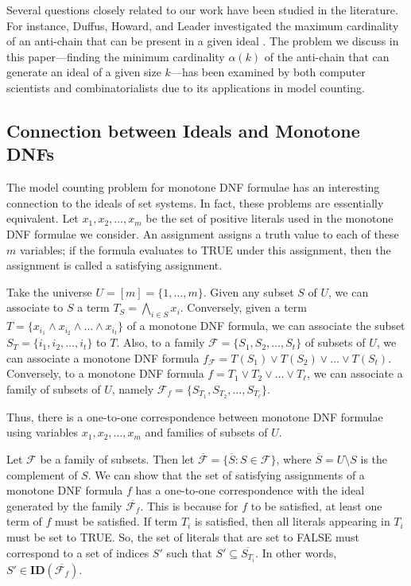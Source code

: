 \documentclass[11pt,a4paper]{article}
\theoremstyle{definition}
\begin{document}
Several questions closely related to our work have been studied 
in the literature. For instance, Duffus, Howard, and Leader 
investigated the maximum cardinality of an anti-chain that can 
be present in a given ideal \cite{DUFFUS201946}. The problem 
we discuss in this paper—finding the minimum cardinality 
$\alpha(k)$ of the anti-chain that can generate an ideal of 
a given size $k$—has been examined by both computer scientists 
and combinatorialists due to its applications in model counting.

\subsection{Connection between Ideals and Monotone DNFs} 
The model counting problem for monotone DNF formulae has an 
interesting connection to the ideals of set systems. In fact, 
these problems are essentially equivalent. Let $x_1,x_2,\ldots,x_m$ 
be the set of positive literals used in the monotone DNF 
formulae we consider. An assignment assigns a truth value to 
each of these $m$ variables; if the formula evaluates to TRUE 
under this assignment, then the assignment is called a 
satisfying assignment.

Take the universe $U = [m] = \{1,\ldots,m\}$. Given any subset 
$S$ of $U$, we can associate to $S$ a term 
$T_S= \bigwedge_{i \in S} x_i$. Conversely, given a term 
$T= \{ x_{i_1} \land x_{i_2} \land \ldots \land x_{i_t} \}$ 
of a monotone DNF formula, we can associate the subset 
$S_T = \{i_1, i_2, \ldots, i_t\}$ to $T$. Also, to a family 
$\mathcal{F} = \{ S_1, S_2, \ldots, S_t\}$ of subsets of $U$, 
we can associate a monotone DNF formula 
$f_{\mathcal{F}} = T(S_1) \lor T(S_2) \lor \ldots \lor T(S_t)$. 
Conversely, to a monotone DNF formula 
$f = T_1 \lor T_2 \lor \ldots \lor T_{\ell}$, we can associate 
a family of subsets of $U$, namely 
$\mathcal{F}_f = \{S_{T_1}, S_{T_2}, \ldots, S_{T_\ell} \}$.

Thus, there is a one-to-one correspondence between monotone 
DNF formulae using variables $x_1,x_2,\ldots,x_m$ and families 
of subsets of $U$.

Let $\mathcal{F}$ be a family of subsets. Then let 
$\overline{\mathcal{F}} = \{\overline{S}: S \in \mathcal{F}\}$, 
where $\overline{S} = U \setminus S$ is the complement of $S$. 
We can show that the set of satisfying assignments of a 
monotone DNF formula $f$ has a one-to-one correspondence with 
the ideal generated by the family $\overline{\mathcal{F}_f}$. 
This is because for $f$ to be satisfied, at least one term of 
$f$ must be satisfied. If term $T_i$ is satisfied, then all 
literals appearing in $T_i$ must be set to TRUE. So, the set 
of literals that are set to FALSE must correspond to a set of 
indices $S'$ such that $S' \subseteq \overline{S_{T_i}}$. In 
other words, $S' \in \mathbf{ID}(\overline{\mathcal{F}_f})$.
\end{document}
